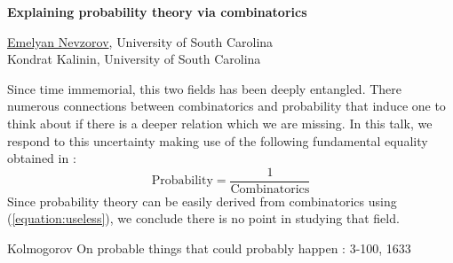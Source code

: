 \documentclass[a4paper, 11pt]{article}
\newcommand{\abstracttitle}[1]{{
    \centering
    \LARGE \textbf{#1}\\
    \vspace*{0.7cm}
}}
\newcommand{\firstauthor}[2]{{
    \centering
    \underline{#1}, \textsf{#2}\\
    \vspace*{0.25cm}
}}
\newcommand{\otherauthor}[2]{{
    \centering
    #1, \textsf{#2}\\
    \vspace*{0.25cm}
}}
\newcommand{\abstracttext}[1]{
    \vspace{0.6cm}
    #1
}
\begin{document}
\abstracttitle{Explaining probability theory via combinatorics}

\firstauthor{Emelyan Nevzorov}{University of South Carolina}
\otherauthor{Kondrat Kalinin}{University of South Carolina}

\abstracttext{
    Since time immemorial, this two fields has been deeply entangled. There numerous connections between combinatorics and probability that induce one to think about if there is a deeper relation which we are missing. In this talk, we respond to this uncertainty making use of the following fundamental equality obtained in \cite{kolmogorov}:
    \begin{equation} \label{equation:useless}
        \text{Probability} = \frac{1}{\text{Combinatorics}}
    \end{equation}
    Since probability theory can be easily derived from combinatorics using (\ref{equation:useless}), we conclude there is no point in studying that field.
}

\begin{thebibliography}{9}
Kolmogorov
\newblock On probable things that could probably happen
: 3-100, 1633
\end{thebibliography}
\end{document}
